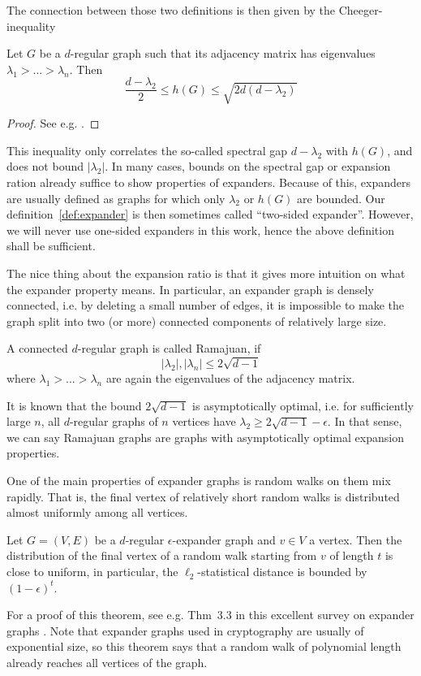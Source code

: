 The connection between those two definitions is then given by the Cheeger-inequality
\begin{prop}
    Let $G$ be a $d$-regular graph such that its adjacency matrix has eigenvalues $\lambda_1 > ... > \lambda_n$.
    Then
    \begin{equation*}
        \frac {d - \lambda_2} 2 \leq h(G) \leq \sqrt{2d(d - \lambda_2)}
    \end{equation*}
\end{prop}
\begin{proof}
    See e.g. \cite{cheeger_inequality}.
\end{proof}
This inequality only correlates the so-called spectral gap $d - \lambda_2$ with $h(G)$, and does not bound $|\lambda_2|$.
In many cases, bounds on the spectral gap or expansion ration already suffice to show properties of expanders.
Because of this, expanders are usually defined as graphs for which only $\lambda_2$ or $h(G)$ are bounded.
Our definition~\ref{def:expander} is then sometimes called ``two-sided expander''.
However, we will never use one-sided expanders in this work, hence the above definition shall be sufficient.

The nice thing about the expansion ratio is that it gives more intuition on what the expander property means.
In particular, an expander graph is densely connected, i.e. by deleting a small number of edges, it is impossible to make the graph split into two (or more) connected components of relatively large size.
\begin{definition}
    A connected $d$-regular graph is called Ramajuan, if
    \begin{equation*}
        |\lambda_2|, |\lambda_n| \leq 2\sqrt{d - 1}
    \end{equation*}
    where $\lambda_1 > ... > \lambda_n$ are again the eigenvalues of the adjacency matrix.
\end{definition}
It is known that the bound $2\sqrt{d - 1}$ is asymptotically optimal, i.e. for sufficiently large $n$, all $d$-regular graphs of $n$ vertices have $\lambda_2 \geq 2\sqrt{d - 1} - \epsilon$.
In that sense, we can say Ramajuan graphs are graphs with asymptotically optimal expansion properties.

One of the main properties of expander graphs is random walks on them mix rapidly.
That is, the final vertex of relatively short random walks is distributed almost uniformly among all vertices.
\begin{theorem}
    \label{prop:expander_random_walk}
    Let $G = (V, E)$ be a $d$-regular $\epsilon$-expander graph and $v \in V$ a vertex.
    Then the distribution of the final vertex of a random walk starting from $v$ of length $t$ is close to uniform, in particular, the $\ell_2$-statistical distance is bounded by $(1 - \epsilon)^t$.
\end{theorem}
For a proof of this theorem, see e.g. Thm~3.3 in this excellent survey on expander graphs \cite{expander_survey}.
Note that expander graphs used in cryptography are usually of exponential size, so this theorem says that a random walk of polynomial length already reaches all vertices of the graph.

